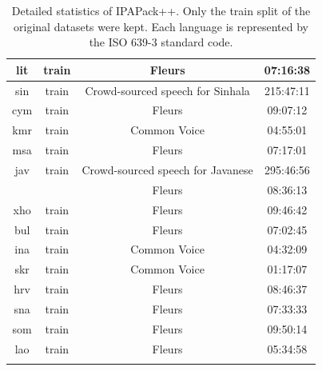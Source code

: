 \begin{longtable}{cccc}
lit & train & Fleurs & 07:16:38 \\  \midrule
sin & train & Crowd-sourced speech for Sinhala & 215:47:11 \\ \midrule
cym & train & Fleurs & 09:07:12 \\  \midrule
kmr & train & Common Voice & 04:55:01 \\ \midrule
msa & train & Fleurs & 07:17:01 \\  \midrule
jav & train & Crowd-sourced speech for Javanese & 295:46:56 \\ 
 & & Fleurs & 08:36:13 \\  \midrule
xho & train & Fleurs & 09:46:42 \\\midrule
bul & train & Fleurs & 07:02:45 \\ \midrule
ina & train & Common Voice & 04:32:09 \\ \midrule
skr & train & Common Voice & 01:17:07 \\  \midrule
hrv & train & Fleurs & 08:46:37 \\  \midrule
sna & train & Fleurs & 07:33:33 \\  \midrule
som & train & Fleurs & 09:50:14 \\ \midrule
lao & train & Fleurs & 05:34:58 \\ \bottomrule
\caption{Detailed statistics of IPAPack++. Only the train split of the original datasets were kept. Each language is represented by the ISO 639-3 standard code. }
\label{app:plus_stats}
\end{longtable}
